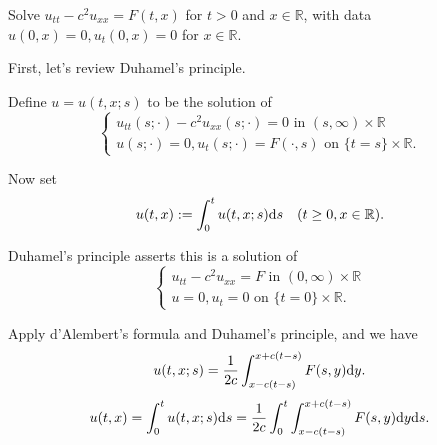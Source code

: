 \begin{pro}
  Solve $u_{tt}-c^2u_{xx}=F(t, x)$ for
  $t>0$ and $x\in\mathbb{R}$,
  with data $u(0, x)=0, u_t(0, x) = 0$
  for $x\in\mathbb{R}$.
\end{pro}

\begin{sol}
  First, let's review Duhamel's principle.
  
  Define $u=u(t, x; s)$ to be the solution of
  \begin{displaymath}
    \begin{cases}
      u_{tt}(s; \cdot) - c^2u_{xx}(s; \cdot) = 0 \text{ in } (s, \infty)\times\mathbb{R} \\
      u(s; \cdot) = 0, u_t(s; \cdot) = F(\cdot, s) \text{ on } \{t=s\}\times\mathbb{R}.
    \end{cases}
  \end{displaymath}

  Now set
  \begin{displaymath}
    u(t, x) := \int_0^tu(t, x; s) \mathrm{d} s \quad (t\ge 0, x\in\mathbb{R}).
  \end{displaymath}

  Duhamel's principle asserts this is a solution of
  \begin{displaymath}
    \begin{cases}
      u_{tt}-c^2u_{xx} = F \text{ in } (0, \infty)\times\mathbb{R} \\
      u=0, u_t = 0 \text{ on } \{t=0\}\times\mathbb{R}.
    \end{cases}
  \end{displaymath}

  Apply d'Alembert's formula and Duhamel's principle, and we have
  \begin{displaymath}
    u(t, x; s) = \frac{1}{2c}\int_{x-c(t-s)}^{x+c(t-s)}F(s, y)\mathrm{d} y.
  \end{displaymath}
  \begin{align*}
    u(t, x) = \int_0^tu(t, x; s)\mathrm{d} s = \frac{1}{2c}\int_0^t\int_{x-c(t-s)}^{x+c(t-s)}F(s, y)\mathrm{d} y\mathrm{d} s.
  \end{align*}


\end{sol}
